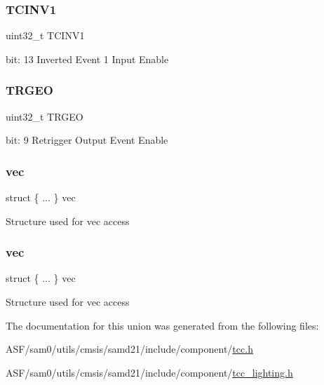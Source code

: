 \subsubsection{\texorpdfstring{TCINV1}{TCINV1}}
{\footnotesize\ttfamily uint32\+\_\+t T\+C\+I\+N\+V1}

bit\+: 13 Inverted Event 1 Input Enable \mbox{\label{union_t_c_c___e_v_c_t_r_l___type_aeddf239b10227a4de678029a25498ddd}} 
\subsubsection{\texorpdfstring{TRGEO}{TRGEO}}
{\footnotesize\ttfamily uint32\+\_\+t T\+R\+G\+EO}

bit\+: 9 Retrigger Output Event Enable \mbox{\label{union_t_c_c___e_v_c_t_r_l___type_aa8a9abf8365c64947b20e3741f7ec110}} 
\subsubsection{\texorpdfstring{vec}{vec}\hspace{0.1cm}{\footnotesize\ttfamily [1/2]}}
{\footnotesize\ttfamily struct \{ ... \}   vec}

Structure used for vec access \mbox{\label{union_t_c_c___e_v_c_t_r_l___type_acc4d9012b12ab89381276802dd54a67c}} 
\subsubsection{\texorpdfstring{vec}{vec}\hspace{0.1cm}{\footnotesize\ttfamily [2/2]}}
{\footnotesize\ttfamily struct \{ ... \}   vec}

Structure used for vec access 

The documentation for this union was generated from the following files\+:\begin{DoxyCompactItemize}
\item 
A\+S\+F/sam0/utils/cmsis/samd21/include/component/\mbox{\hyperlink{tcc_8h}{tcc.\+h}}\item 
A\+S\+F/sam0/utils/cmsis/samd21/include/component/\mbox{\hyperlink{tcc__lighting_8h}{tcc\+\_\+lighting.\+h}}\end{DoxyCompactItemize}
